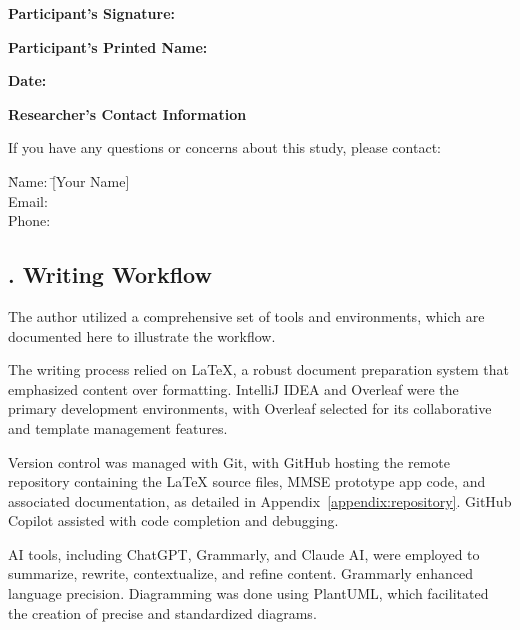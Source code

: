 \vspace{0.5cm}

\noindent
\textbf{Participant's Signature:} \underline{\hspace{8cm}}

\noindent
\textbf{Participant's Printed Name:} \underline{\hspace{8cm}}

\noindent
\textbf{Date:} \underline{\hspace{8cm}}

\vspace{0.5cm}

\noindent
\textbf{Researcher’s Contact Information}

\noindent
If you have any questions or concerns about this study, please contact:

\begin{tabbing}
\hspace{3cm} \= Name: \hspace{1cm} \= [Your Name] \\
\> Email:  \\
\> Phone: 
\end{tabbing}


\newpage
{}

\subsection*{. Writing Workflow} \label{appendix:writing-workflow}


The author utilized a comprehensive set of tools and environments, which are documented here to illustrate the workflow.

The writing process relied on \LaTeX{}, a robust document preparation system that emphasized content over formatting. IntelliJ IDEA and Overleaf were the primary development environments, with Overleaf selected for its collaborative and template management features.

Version control was managed with Git, with GitHub hosting the remote repository containing the \LaTeX{} source files, MMSE prototype app code, and associated documentation, as detailed in Appendix~\ref{appendix:repository}. GitHub Copilot assisted with code completion and debugging.

AI tools, including ChatGPT, Grammarly, and Claude AI, were employed to summarize, rewrite, contextualize, and refine content. Grammarly enhanced language precision. Diagramming was done using PlantUML, which facilitated the creation of precise and standardized diagrams.
